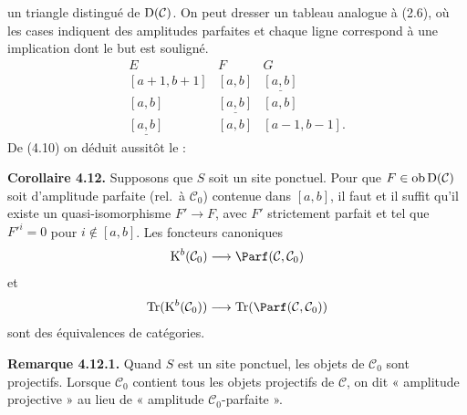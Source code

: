 un
triangle distingué de \(\Dpx(\mathcal C)\). On peut dresser un tableau analogue à (2.6), où les cases indiquent des amplitudes parfaites et chaque ligne correspond à une implication dont le but est souligné.
\[
\begin{array}{ccc}
E&F&G\\[0.3em]
{}[a+1,b+1]&{}[a,b]&\underline{[a,b]}\\
{}[a,b]&\underline{[a,b]}&{}[a,b]\\
\underline{[a,b]}&{}[a,b]&{}[a-1,b-1].
\end{array}
\]
De (4.10) on déduit aussitôt le :

\textbf{Corollaire 4.12.} Supposons que \(S\) soit un site ponctuel. Pour que \(F\in\Ob\Dpx(\mathcal C)\) soit d'amplitude parfaite (rel.\ à \(\mathcal C_0\)) contenue dans \([a,b]\), il faut et il suffit qu'il existe un quasi-isomorphisme \(F'\to F\), avec \(F'\) strictement parfait et tel que \(F'^i=0\) pour \(i\notin[a,b]\). Les foncteurs canoniques
\[
  \Kpx^b(\mathcal C_0)\longrightarrow\Parf(\mathcal C,\mathcal C_0)
\]
et
\[
  \Tr(\Kpx^b(\mathcal C_0))\longrightarrow\Tr(\Parf(\mathcal C,\mathcal C_0))
\]
sont des équivalences de catégories.

\textbf{Remarque 4.12.1.} Quand \(S\) est un site ponctuel, les objets de \(\mathcal C_0\) sont projectifs. Lorsque \(\mathcal C_0\) contient tous les objets projectifs de \(\mathcal C\), on dit « amplitude projective » au lieu de « amplitude \(\mathcal C_0\)-parfaite ».



\providecommand{\Cpx}{\mathrm C}
\providecommand{\Kpx}{\mathrm K}
\providecommand{\Dpx}{\mathrm D}
\providecommand{\Ho}{\mathrm H}
\providecommand{\RHom}{\mathrm R\!\operatorname{Hom}}
\renewcommand{\Ob}{\operatorname{ob}}
\providecommand{\qis}{\xrightarrow{\sim}}
\providecommand{\RHom}{\mathrm R\!\Hom}
\providecommand{\Ext}{\operatorname{Ext}}
\providecommand{\Hom}{\operatorname{Hom}}
\providecommand{\Tr}{\operatorname{Tr}}

\providecommand{\Add}{\operatorname{Add}}
\providecommand{\Cart}{\operatorname{Cart}}
\providecommand{\perfamp}{\operatorname{perf.amp}}
\providecommand{\perfdim}{\operatorname{perf.dim}}
\providecommand{\toramp}{\operatorname{tor.amp}}
\providecommand{\torf}{\operatorname{torf}}
\providecommand{\injf}{\operatorname{injf}}
\providecommand{\rg}{\operatorname{rg}}
\providecommand{\is}{\mathrm{is}}
\providecommand{\Mod}{\operatorname{Mod}}



